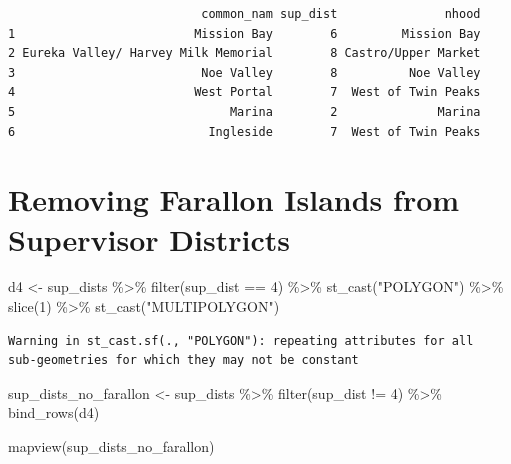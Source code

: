 \documentclass[
  letterpaper,
  DIV=11,
  numbers=noendperiod]{scrreprt}
\newenvironment{Shaded}{\begin{snugshade}}{\end{snugshade}}
\newcommand{\DecValTok}[1]{\textcolor[rgb]{0.68,0.00,0.00}{#1}}
\newcommand{\FunctionTok}[1]{\textcolor[rgb]{0.28,0.35,0.67}{#1}}
\newcommand{\NormalTok}[1]{\textcolor[rgb]{0.00,0.23,0.31}{#1}}
\newcommand{\OtherTok}[1]{\textcolor[rgb]{0.00,0.23,0.31}{#1}}
\newcommand{\SpecialCharTok}[1]{\textcolor[rgb]{0.37,0.37,0.37}{#1}}
\newcommand{\StringTok}[1]{\textcolor[rgb]{0.13,0.47,0.30}{#1}}
\begin{document}
\begin{verbatim}
                           common_nam sup_dist               nhood
1                         Mission Bay        6         Mission Bay
2 Eureka Valley/ Harvey Milk Memorial        8 Castro/Upper Market
3                          Noe Valley        8          Noe Valley
4                         West Portal        7  West of Twin Peaks
5                              Marina        2              Marina
6                           Ingleside        7  West of Twin Peaks
\end{verbatim}

\section{Removing Farallon Islands from Supervisor
Districts}\label{removing-farallon-islands-from-supervisor-districts}

\begin{Shaded}
\begin{Highlighting}[]
\NormalTok{d4 }\OtherTok{\textless{}{-}}\NormalTok{ sup\_dists }\SpecialCharTok{\%\textgreater{}\%} 
  \FunctionTok{filter}\NormalTok{(sup\_dist }\SpecialCharTok{==} \DecValTok{4}\NormalTok{) }\SpecialCharTok{\%\textgreater{}\%} 
  \FunctionTok{st\_cast}\NormalTok{(}\StringTok{"POLYGON"}\NormalTok{) }\SpecialCharTok{\%\textgreater{}\%} 
  \FunctionTok{slice}\NormalTok{(}\DecValTok{1}\NormalTok{) }\SpecialCharTok{\%\textgreater{}\%} 
  \FunctionTok{st\_cast}\NormalTok{(}\StringTok{"MULTIPOLYGON"}\NormalTok{)}
\end{Highlighting}
\end{Shaded}

\begin{verbatim}
Warning in st_cast.sf(., "POLYGON"): repeating attributes for all
sub-geometries for which they may not be constant
\end{verbatim}

\begin{Shaded}
\begin{Highlighting}[]
\NormalTok{sup\_dists\_no\_farallon }\OtherTok{\textless{}{-}}\NormalTok{ sup\_dists }\SpecialCharTok{\%\textgreater{}\%} 
  \FunctionTok{filter}\NormalTok{(sup\_dist }\SpecialCharTok{!=} \DecValTok{4}\NormalTok{) }\SpecialCharTok{\%\textgreater{}\%} 
  \FunctionTok{bind\_rows}\NormalTok{(d4)}

\FunctionTok{mapview}\NormalTok{(sup\_dists\_no\_farallon)}
\end{Highlighting}
\end{Shaded}
\end{document}
